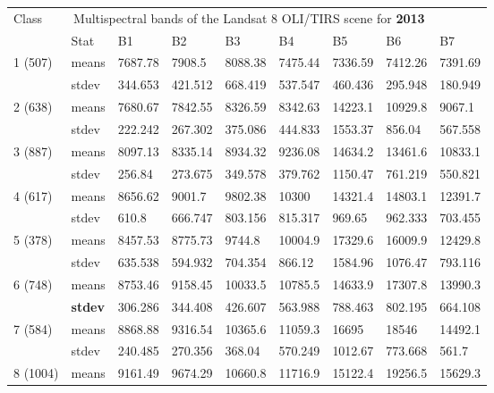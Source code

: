 \documentclass[jmse,article,submit,pdftex,moreauthors]{Definitions/mdpi}
\begin{document}
\begin{table}[H]
  \centering
  \tiny
  \begin{tabularx}{\linewidth}{p{1.3cm}p{1.0cm}p{1.0cm}p{1.0cm}p{1.0cm}p{1.0cm}p{1.0cm}p{1.0cm}p{1.0cm}}
  \toprule
  \multirow{2}{*}{Class} & \multicolumn{7}{c}{Multispectral bands of the Landsat 8 OLI/TIRS scene for \textbf{2013}} \\
    & Stat & B1 & B2 & B3 & B4 & B5 & B6 & B7 \\
    \midrule
    \multirow{2}{*}{1 (507)} & means & 7687.78 & 7908.5 & 8088.38 & 7475.44 & 7336.59 & 7412.26 & 7391.69 \\
    & stdev & 344.653 & 421.512 & 668.419 & 537.547 & 460.436 & 295.948 & 180.949 \\
    \midrule
    \multirow{2}{*}{2 (638)} & means & 7680.67 & 7842.55 & 8326.59 & 8342.63 & 14223.1 & 10929.8 & 9067.1 \\
    & stdev & 222.242 & 267.302 & 375.086 & 444.833 & 1553.37 & 856.04 & 567.558 \\
    \midrule
    \multirow{2}{*}{3 (887)} & means & 8097.13 & 8335.14 & 8934.32 & 9236.08 & 14634.2 & 13461.6 & 10833.1 \\
    & stdev & 256.84 & 273.675 & 349.578 & 379.762 & 1150.47 & 761.219 & 550.821 \\
    \midrule
    \multirow{2}{*}{4 (617)} & means & 8656.62 & 9001.7 & 9802.38 & 10300 & 14321.4 & 14803.1 & 12391.7 \\
    & stdev & 610.8 & 666.747 & 803.156 & 815.317 & 969.65 & 962.333 & 703.455 \\
    \midrule
    \multirow{2}{*}{5 (378)} & means & 8457.53 & 8775.73 & 9744.8 & 10004.9 & 17329.6 & 16009.9 & 12429.8 \\
    & stdev & 635.538 & 594.932 & 704.354 & 866.12 & 1584.96 & 1076.47 & 793.116 \\
    \midrule
    \multirow{2}{*}{6 (748)} & means & 8753.46 & 9158.45 & 10033.5 & 10785.5 & 14633.9 & 17307.8 & 13990.3 \\
    & \textbf{stdev} & 306.286 & 344.408 & 426.607 & 563.988 & 788.463 & 802.195 & 664.108 \\
    \midrule
    \multirow{2}{*}{7 (584)} & means & 8868.88 & 9316.54 & 10365.6 & 11059.3 & 16695 & 18546 & 14492.1 \\
    & stdev & 240.485 & 270.356 & 368.04 & 570.249 & 1012.67 & 773.668 & 561.7 \\
    \midrule
    \multirow{2}{*}{8 (1004)} & means & 9161.49 & 9674.29 & 10660.8 & 11716.9 & 15122.4 & 19256.5 & 15629.3 \\

\end{tabularx}
\end{table}
\end{document}
